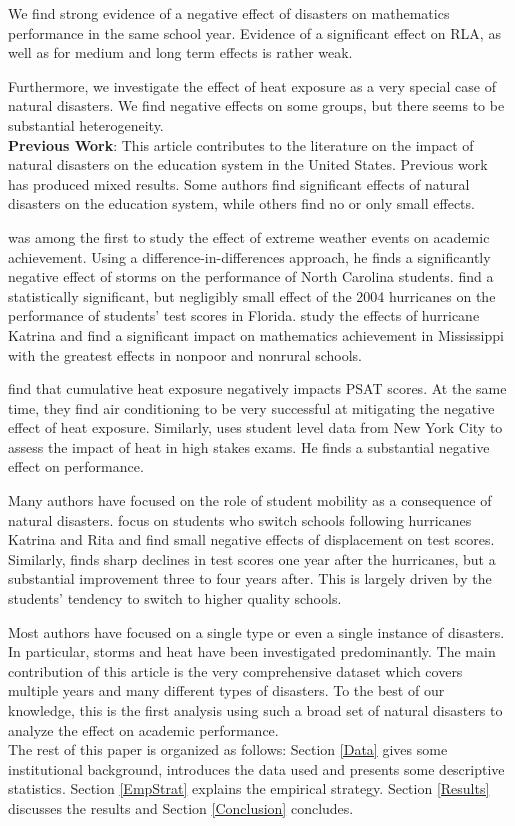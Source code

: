 We find strong evidence of a negative effect of disasters on mathematics performance in the same school year. Evidence of a significant effect on RLA, as well as for medium and long term effects is rather weak.

 Furthermore, we investigate the effect of heat exposure as a very special case of natural disasters. We find negative effects on some groups, but there seems to be substantial heterogeneity.
\\

\textbf{Previous Work}: This article contributes to the literature on the impact of natural disasters on the education system in the United States. Previous work has produced mixed results. Some authors find significant effects of natural disasters on the education system, while others find no or only small effects.

\cite{Holmes_2002} was among the first to study the effect of extreme weather events on academic achievement. Using a difference-in-differences approach, he finds a significantly negative effect of storms on the performance of North Carolina students. \cite{Baggerly_2008} find a statistically significant, but negligibly small effect of the 2004 hurricanes on the performance of students' test scores in Florida. \cite{Lamb_2013} study the effects of hurricane Katrina and find a significant impact on mathematics achievement in Mississippi with the greatest effects in nonpoor and nonrural schools.

\cite{Goodman_2020} find that cumulative heat exposure negatively impacts PSAT scores. At the same time, they find air conditioning to be very successful at mitigating the negative effect of heat exposure. Similarly, \cite{Park_2022} uses student level data from New York City to assess the impact of heat in high stakes exams. He finds a substantial negative effect on performance.

Many authors have focused on the role of student mobility as a consequence of natural disasters. \cite{Pane_2008} focus on students who switch schools following hurricanes Katrina and Rita and find small negative effects of displacement on test scores. Similarly, \cite{Sacerdote_2012} finds sharp declines in test scores one year after the hurricanes, but a substantial improvement three to four years after. This is largely driven by the students' tendency to switch to higher quality schools.

Most authors have focused on a single type or even a single instance of disasters. In particular, storms and heat have been investigated predominantly. The main contribution of this article is the very comprehensive dataset which covers multiple years and many different types of disasters. To the best of our knowledge, this is the first analysis using such a broad set of natural disasters to analyze the effect on academic performance.
\\

The rest of this paper is organized as follows: Section \ref{Data} gives some institutional background, introduces the data used and presents some descriptive statistics. Section \ref{EmpStrat} explains the empirical strategy. Section \ref{Results} discusses the results and Section \ref{Conclusion} concludes.

